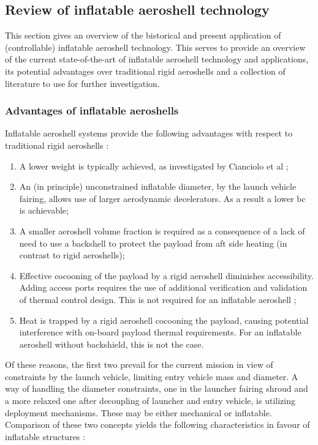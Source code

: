 \subsection{Review of inflatable aeroshell technology}\label{sec:aeroshells}
This section gives an overview of the bistorical and present application of (controllable) inflatable aeroshell technology. This serves to provide an overview of the current state-of-the-art of inflatable aeroshell technology and applications, its potential advantages over traditional rigid aeroshells and a collection of literature to use for further investigation.

\subsubsection{Advantages of inflatable aeroshells}
Inflatable aeroshell systems provide the following advantages with respect to traditional rigid aeroshells \cite{Cassapakis1995, Hughes2005}:
\begin{enumerate}
\item A lower weight is typically achieved, as investigated by Cianciolo et al \cite{Cianciolo2010};
\item An (in principle) unconstrained inflatable diameter, by the launch vehicle fairing, allows use of larger aerodynamic decelerators. As a result a lower \gls{bc} is achievable;
\item A smaller aeroshell volume fraction is required as a consequence of a lack of need to use a backshell to protect the payload from aft side heating (in contrast to rigid aeroshells);
\item Effective cocooning of the payload by a rigid aeroshell diminishes accessibility. Adding access ports requires the use of additional verification and validation of thermal control design. This is not required for an inflatable aeroshell \cite{Johnson1997};
\item Heat is trapped by a rigid aeroshell cocooning the payload, causing potential interference with on-board payload thermal requirements. For an inflatable aeroshell without backshield, this is not the case.
\end{enumerate}
Of these reasons, the first two prevail for the current mission in view of constraints by the launch vehicle, limiting entry vehicle mass and diameter. A way of handling the diameter constraints, one in the launcher fairing shroud and a more relaxed one after decoupling of launcher and entry vehicle, is utilizing deployment mechanisms. These may be either mechanical or inflatable. Comparison of these two concepts yields the following characteristics in favour of inflatable structures \cite{Cassapakis1995}:
